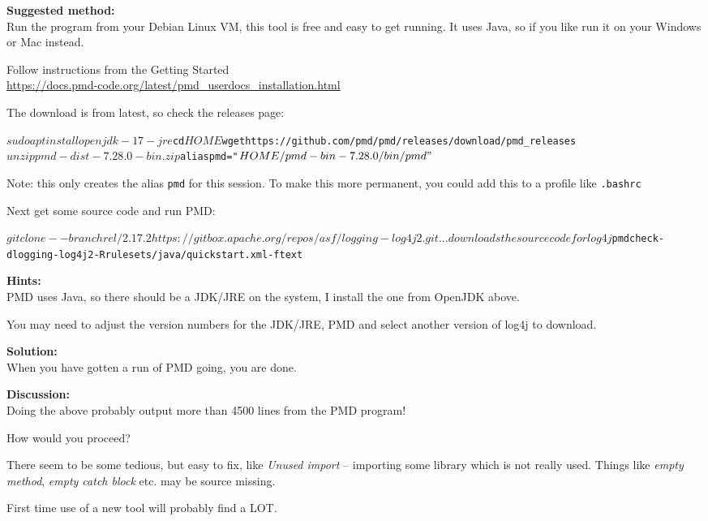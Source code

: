 \documentclass[a4paper,11pt,notitlepage]{report}
\begin{document}
{\bf Suggested method:}\\
Run the program from your Debian Linux VM, this tool is free and easy to get running. It uses Java, so if you like run it on your Windows or Mac instead.

Follow instructions from the Getting Started\\
\url{https://docs.pmd-code.org/latest/pmd_userdocs_installation.html}

The download is from latest, so check the releases page: 

\begin{alltt}\footnotesize
$ sudo apt install openjdk-17-jre
$ cd $HOME
$ wget https://github.com/pmd/pmd/releases/download/pmd_releases%
$ unzip pmd-dist-7.28.0-bin.zip
$ alias pmd="$HOME/pmd-bin-7.28.0/bin/pmd"
$
\end{alltt}

Note: this only creates the alias \verb+pmd+ for this session. To make this more permanent, you could add this to a profile like \verb+.bashrc+

Next get some source code and run PMD:
\begin{alltt}\footnotesize
$ git clone --branch rel/2.17.2 https://gitbox.apache.org/repos/asf/logging-log4j2.git
... downloads the source code for log4j
$ pmd check -d logging-log4j2 -R rulesets/java/quickstart.xml -f text
\end{alltt}


{\bf Hints:}\\
PMD uses Java, so there should be a JDK/JRE on the system, I install the one from OpenJDK above.

You may need to adjust the version numbers for the JDK/JRE, PMD and select another version of log4j to download.

{\bf Solution:}\\
When you have gotten a run of PMD going, you are done.

{\bf Discussion:}\\
Doing the above probably output more than 4500 lines from the PMD program!

How would you proceed?

There seem to be some tedious, but easy to fix, like \emph{Unused import} -- importing some library which is not really used. Things like \emph{empty method}, \emph{empty catch block} etc. may be source missing.

First time use of a new tool will probably find a LOT.
\end{document}
